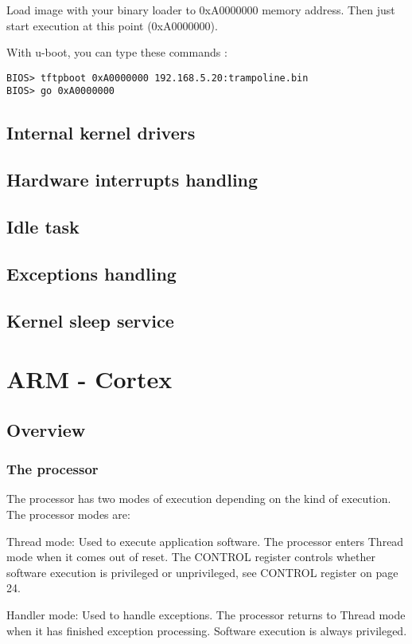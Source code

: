 Load image with your binary loader to 0xA0000000 memory address. Then just start execution at this point (0xA0000000).

With u-boot, you can type these commands :
\begin{lstlisting}
BIOS> tftpboot 0xA0000000 192.168.5.20:trampoline.bin
BIOS> go 0xA0000000
\end{lstlisting}

\subsection{Internal kernel drivers}

\subsection{Hardware interrupts handling}

\subsection{Idle task}

\subsection{Exceptions handling}

\subsection{Kernel sleep service}


\section{ARM - Cortex}

\subsection{Overview}

\subsubsection{The processor}

The processor has two modes of execution depending on the kind of execution.
The processor modes are:
\begin{penum}
\item Thread mode: Used to execute application software.
The processor enters Thread mode when it comes out of reset.
The CONTROL register controls whether software execution is privileged or unprivileged, see CONTROL register on page 24.
\item Handler mode: Used to handle exceptions.
The processor returns to Thread mode when it has finished exception processing.
Software execution is always privileged.
\end{penum}

